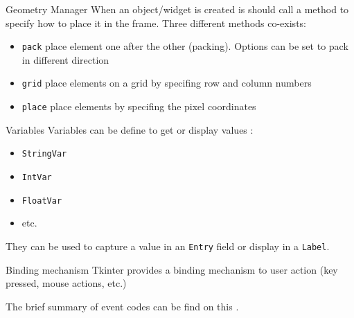 \begin{frame}{Geometry Manager}
    When an object/widget is created is should call a method to specify how to place it in the frame. Three different methods co-exists:
    \begin{itemize}
        \item \texttt{pack} place element one after the other (packing). Options can be set to pack in different direction
        \item \texttt{grid} place elements on a grid by specifing row and column numbers
        \item \texttt{place} place elements by specifing the pixel coordinates
    \end{itemize}
\end{frame}

\begin{frame}{Variables}
    Variables can be define to get or display values :
    \begin{itemize}
        \item \texttt{StringVar}
        \item \texttt{IntVar}
        \item \texttt{FloatVar}
        \item etc.
    \end{itemize}

    They can be used to capture a value in an \texttt{Entry} field or display in a \texttt{Label}.

\end{frame}

\begin{frame}{Binding mechanism}
    Tkinter provides a binding mechanism to user action (key pressed, mouse actions, etc.)

    
    The brief summary of event codes can be find on this .

\end{frame}